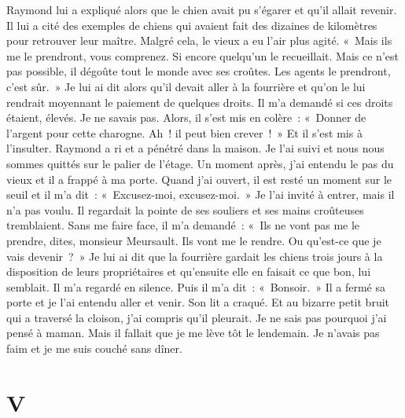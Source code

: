 \documentclass[french,twoside]{book} %
\newcommand\chapteropen{} %
\newcommand\chapterclose{} %
\begin{document}
Raymond lui a expliqué alors que le chien avait pu s’égarer et qu’il allait revenir. Il lui a cité des exemples de chiens qui avaient fait des dizaines de kilomètres pour retrouver leur maître. Malgré cela, le vieux a eu l’air plus agité. « Mais ils me le prendront, vous comprenez. Si encore quelqu’un le recueillait. Mais ce n’est pas possible, il dégoûte tout le monde avec ses croûtes. Les agents le prendront, c’est sûr. » Je lui ai dit alors qu’il devait aller à la fourrière et qu’on le lui rendrait moyennant le paiement de quelques droits. Il m’a demandé si ces droits étaient, élevés. Je ne savais pas. Alors, il s’est mis en colère : « Donner de l’argent pour cette charogne. Ah ! il peut bien crever ! » Et il s’est mis à l’insulter. Raymond a ri et a pénétré dans la maison. Je l’ai suivi et nous nous sommes quittés sur le palier de l’étage. Un moment après, j’ai entendu le pas du vieux et il a frappé à ma porte. Quand j’ai ouvert, il est resté un moment sur le seuil et il m’a dit : « Excusez-moi, excusez-moi. » Je l’ai invité à entrer, mais il n’a pas voulu. Il regardait la pointe de ses souliers et ses mains croûteuses tremblaient. Sans me faire face, il m’a demandé : « Ils ne vont pas me le prendre, dites, monsieur Meursault. Ils vont me le rendre. Ou qu’est-ce que je vais devenir ? » Je lui ai dit que la fourrière gardait les chiens trois jours à la disposition de leurs propriétaires et qu’ensuite elle en faisait ce que bon, lui semblait. Il m’a regardé en silence. Puis il m’a dit : « Bonsoir. » Il a fermé sa porte et je l’ai entendu aller et venir. Son lit a craqué. Et au bizarre petit bruit qui a traversé la cloison, j’ai compris qu’il pleurait. Je ne sais pas pourquoi j’ai pensé à maman. Mais il fallait que je me lève tôt le lendemain. Je n’avais pas faim et je me suis couché sans dîner.
\chapterclose


\chapteropen
\chapter[{V}]{V}
\label{I5}
\end{document}
